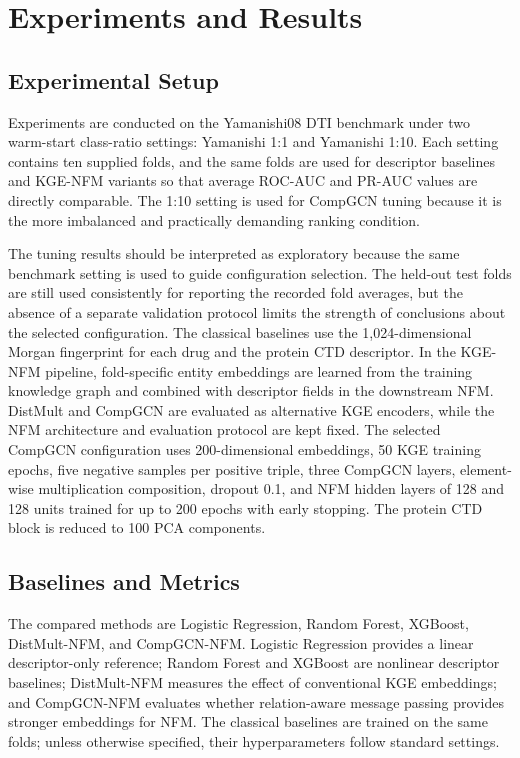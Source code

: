 \section{Experiments and Results}
\label{sec:results}

\subsection{Experimental Setup}

Experiments are conducted on the Yamanishi08 DTI benchmark under two warm-start class-ratio settings: Yamanishi 1:1 and Yamanishi 1:10. Each setting contains ten supplied folds, and the same folds are used for descriptor baselines and KGE-NFM variants so that average ROC-AUC and PR-AUC values are directly comparable. The 1:10 setting is used for CompGCN tuning because it is the more imbalanced and practically demanding ranking condition.

The tuning results should be interpreted as exploratory because the same benchmark setting is used to guide configuration selection. The held-out test folds are still used consistently for reporting the recorded fold averages, but the absence of a separate validation protocol limits the strength of conclusions about the selected configuration. The classical baselines use the 1,024-dimensional Morgan fingerprint for each drug and the protein CTD descriptor. In the KGE-NFM pipeline, fold-specific entity embeddings are learned from the training knowledge graph and combined with descriptor fields in the downstream NFM. DistMult and CompGCN are evaluated as alternative KGE encoders, while the NFM architecture and evaluation protocol are kept fixed. The selected CompGCN configuration uses 200-dimensional embeddings, 50 KGE training epochs, five negative samples per positive triple, three CompGCN layers, element-wise multiplication composition, dropout 0.1, and NFM hidden layers of 128 and 128 units trained for up to 200 epochs with early stopping. The protein CTD block is reduced to 100 PCA components.

\subsection{Baselines and Metrics}

The compared methods are Logistic Regression, Random Forest, XGBoost, DistMult-NFM, and CompGCN-NFM. Logistic Regression provides a linear descriptor-only reference; Random Forest and XGBoost are nonlinear descriptor baselines; DistMult-NFM measures the effect of conventional KGE embeddings; and CompGCN-NFM evaluates whether relation-aware message passing provides stronger embeddings for NFM. The classical baselines are trained on the same folds; unless otherwise specified, their hyperparameters follow standard settings.

